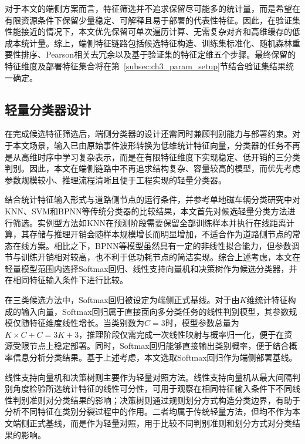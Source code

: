 \documentclass{xdupgthesis}
\begin{document}
对于本文的端侧方案而言，特征筛选并不追求保留尽可能多的统计量，而是希望在有限资源条件下保留少量稳定、可解释且易于部署的代表性特征。因此，在验证集性能接近的情况下，本文优先保留可单次遍历计算、无需复杂对齐和高维缓存的低成本统计量。综上，端侧特征链路包括候选特征构造、训练集标准化、随机森林重要性排序、Pearson相关去冗余以及基于验证集的特征定维五个步骤。最终保留的特征维度及部署特征集合将在第~\ref{subsec:ch3_param_setup}节结合验证集结果统一确定。


\subsection{轻量分类器设计}
\label{subsec:ch3_edge_cls}

在完成候选特征筛选后，端侧分类器的设计还需同时兼顾判别能力与部署约束。对于本文场景，输入已由原始事件波形转换为低维统计特征向量，分类器的任务不再是从高维时序中学习复杂表示，而是在有限特征维度下实现稳定、低开销的三分类判别。因此，本文在端侧链路中不再追求结构复杂、容量较高的模型，而优先考虑参数规模较小、推理流程清晰且便于工程实现的轻量分类器。

结合统计特征输入形式与道路侧节点的运行条件，并参考单地磁车辆分类研究中对KNN、SVM和BPNN等传统分类器的比较结果\cite{ch3_xu2018imbalanced}，本文首先对候选轻量分类方法进行筛选。实例型方法如KNN在预测阶段需要保留全部训练样本并执行在线距离计算，其存储与推理开销会随样本规模增长而明显增加，不适合作为道路侧节点的常态在线方案。相比之下，BPNN等模型虽然具有一定的非线性拟合能力，但参数调节与训练开销相对较高，也不利于低功耗节点的简洁实现。综合上述考虑，本文在轻量模型范围内选择Softmax回归、线性支持向量机和决策树作为候选分类器，并在相同特征输入条件下进行比较。

在三类候选方法中，Softmax回归被设定为端侧正式基线。对于由$K$维统计特征构成的输入向量，Softmax回归属于直接面向多分类任务的线性判别模型，其参数规模仅随特征维度线性增长。当类别数为$C=3$时，模型参数总量为$K\times C+C=3K+3$，推理阶段仅需完成一次线性映射与概率归一化，便于在资源受限节点上稳定部署。同时，Softmax回归能够直接输出类别概率，便于结合概率信息分析分类结果。基于上述考虑，本文选取Softmax回归作为端侧部署基线。

线性支持向量机和决策树则主要作为轻量对照方法。线性支持向量机从最大间隔判别角度检验所选统计特征的线性可分性，可用于观察在相同特征输入条件下不同线性判别准则对分类结果的影响；决策树则通过规则划分方式构造分类边界，有助于分析不同特征在类别分裂过程中的作用。二者均属于传统轻量方法，但均不作为本文端侧正式基线，而是作为轻量对照，用于比较不同判别准则和划分方式对分类结果的影响。
\end{document}
